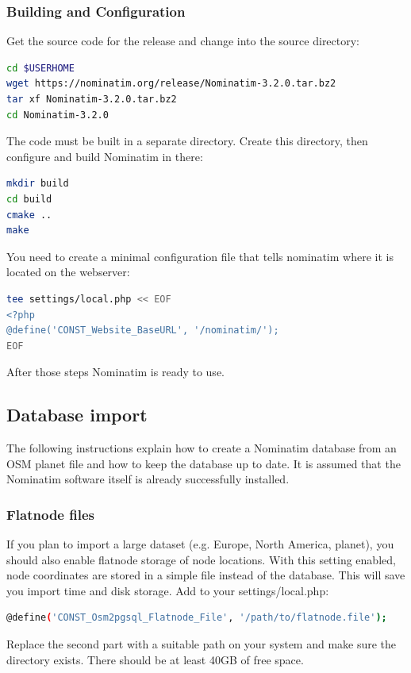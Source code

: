 \documentclass[12pt]{article}
\begin{document}
\subsubsection{Building and Configuration}
Get the source code for the release and change into the source directory:
\begin{lstlisting}[language=bash,breaklines=true]
cd $USERHOME
wget https://nominatim.org/release/Nominatim-3.2.0.tar.bz2
tar xf Nominatim-3.2.0.tar.bz2
cd Nominatim-3.2.0
\end{lstlisting}
The code must be built in a separate directory. Create this directory, then configure and build
Nominatim in there:
\begin{lstlisting}[language=bash,breaklines=true]
mkdir build
cd build
cmake ..
make
\end{lstlisting}
You need to create a minimal configuration file that tells nominatim where it is located on the
webserver:
\begin{lstlisting}[language=bash,breaklines=true]
tee settings/local.php << EOF
<?php
@define('CONST_Website_BaseURL', '/nominatim/');
EOF
\end{lstlisting}
After those steps Nominatim is ready to use.
\subsection{Database import}
The following instructions explain how to create a Nominatim database from an OSM planet file
and how to keep the database up to date. It is assumed that the Nominatim software itself is already successfully installed.
\subsubsection{Flatnode files}
If you plan to import a large dataset (e.g. Europe, North America, planet), you should also
enable flatnode storage of node locations. With this setting enabled, node coordinates are
stored in a simple file instead of the database. This will save you import time and disk storage.
Add to your settings/local.php:
\begin{lstlisting}[language=bash,breaklines=true]
@define('CONST_Osm2pgsql_Flatnode_File', '/path/to/flatnode.file');
\end{lstlisting}
Replace the second part with a suitable path on your system and make sure the directory exists.
There should be at least 40GB of free space.
\end{document}
